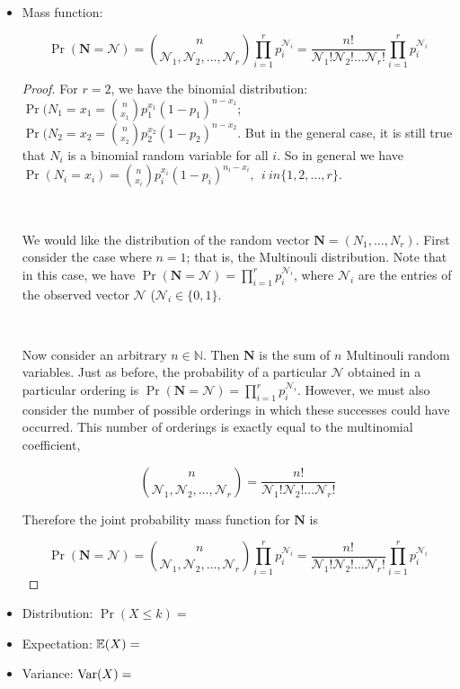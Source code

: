 \begin{itemize}

\item Mass function:

\[
\Pr(\boldsymbol{N} = \boldsymbol{\mathcal{N}}) = \binom{n}{\mathcal{N}_1, \mathcal{N}_2, \ldots, \mathcal{N}_r} \prod_{i=1}^r p_i^{\mathcal{N}_i} = \frac{n!}{\mathcal{N}_1! \mathcal{N}_2! \ldots \mathcal{N}_r!}\prod_{i=1}^r p_i^{\mathcal{N}_i} 
\]

\begin{proof}
For \(r=2\), we have the binomial distribution: \(\Pr(N_1 = x_1 = \binom{n}{x_1}p_1^{x_1}(1 - p_1)^{n-x_1}\); \(\Pr(N_2 = x_2 = \binom{n}{x_2}p_2^{x_2}(1 - p_2)^{n-x_2}\). But in the general case, it is still true that \(N_i\) is a binomial random variable for all \(i\). So in general we have \(\Pr(N_i = x_i) = \binom{n}{x_i} p_i^{x_i}(1-p_i)^{n_i -x_i}, \ \ i \ in \{1, 2, \ldots, r\}\).

\

We would like the distribution of the random vector \(\boldsymbol{N} = (N_1, \ldots, N_r)\). First consider the case where \(n=1\); that is, the Multinouli distribution. Note that in this case, we have \(\Pr(\boldsymbol{N} = \boldsymbol{\mathcal{N}}) = \prod_{i=1}^r p_i^{\mathcal{N}_i}\), where \(\mathcal{N}_i\) are the entries of the observed vector \(\boldsymbol{\mathcal{N}}\) (\(\mathcal{N}_i \in \{0, 1\}\).

\

Now consider an arbitrary \(n \in \mathbb{N}\). Then \(\boldsymbol{N}\) is the sum of \(n\) Multinouli random variables. Just as before, the probability of a particular \(\boldsymbol{\mathcal{N}}\) obtained in a particular ordering is \(\Pr(\boldsymbol{N} = \boldsymbol{\mathcal{N}}) = \prod_{i=1}^r p_i^{\mathcal{N}_i}\). However, we must also consider the number of possible orderings in which these successes could have occurred. This number of orderings is exactly equal to the multinomial coefficient,

\[
\binom{n}{\mathcal{N}_1, \mathcal{N}_2, \ldots, \mathcal{N}_r} = \frac{n!}{\mathcal{N}_1! \mathcal{N}_2! \ldots \mathcal{N}_r!}
\]

Therefore the joint probability mass function for \(\boldsymbol{N}\) is 

\[
\Pr(\boldsymbol{N} = \boldsymbol{\mathcal{N}}) = \binom{n}{\mathcal{N}_1, \mathcal{N}_2, \ldots, \mathcal{N}_r} \prod_{i=1}^r p_i^{\mathcal{N}_i} = \frac{n!}{\mathcal{N}_1! \mathcal{N}_2! \ldots \mathcal{N}_r!}\prod_{i=1}^r p_i^{\mathcal{N}_i} 
\]

\end{proof}

\item Distribution: \(\Pr(X \leq k) =  \)

\item Expectation: \(\mathbb{E}(X) =  \)

\item Variance: \(\mathrm{Var}(X) = \)

\end{itemize}

